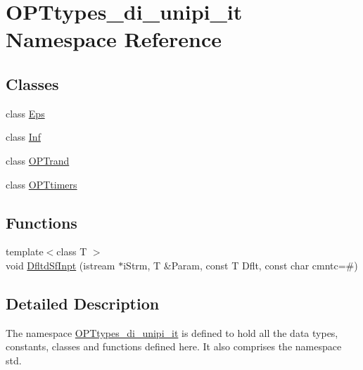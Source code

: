 \hypertarget{namespace_o_p_ttypes__di__unipi__it}{}\section{O\+P\+Ttypes\+\_\+di\+\_\+unipi\+\_\+it Namespace Reference}
\label{namespace_o_p_ttypes__di__unipi__it}
\subsection*{Classes}
\begin{DoxyCompactItemize}
\item 
class \mbox{\hyperlink{class_o_p_ttypes__di__unipi__it_1_1_eps}{Eps}}
\item 
class \mbox{\hyperlink{class_o_p_ttypes__di__unipi__it_1_1_inf}{Inf}}
\item 
class \mbox{\hyperlink{class_o_p_ttypes__di__unipi__it_1_1_o_p_trand}{O\+P\+Trand}}
\item 
class \mbox{\hyperlink{class_o_p_ttypes__di__unipi__it_1_1_o_p_ttimers}{O\+P\+Ttimers}}
\end{DoxyCompactItemize}
\subsection*{Functions}
\begin{DoxyCompactItemize}
\item 
{\footnotesize template$<$class T $>$ }\\void \mbox{\hyperlink{group___o_p_t_utils___f_u_n_c_t_i_o_n_s_gaf4f201a8b54197416f25f062edc98ca6}{Dfltd\+Sf\+Inpt}} (istream $\ast$i\+Strm, T \&Param, const T Dflt, const char cmntc=\textquotesingle{}\#\textquotesingle{})
\end{DoxyCompactItemize}


\subsection{Detailed Description}
The namespace \mbox{\hyperlink{namespace_o_p_ttypes__di__unipi__it}{O\+P\+Ttypes\+\_\+di\+\_\+unipi\+\_\+it}} is defined to hold all the data types, constants, classes and functions defined here. It also comprises the namespace std. 
